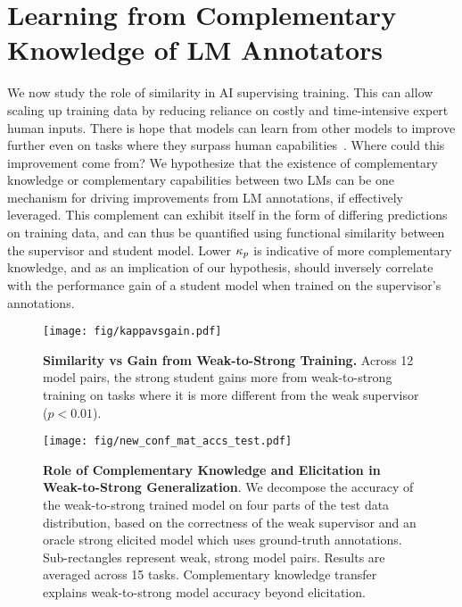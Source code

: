 \section{Learning from Complementary Knowledge of LM Annotators}
\label{sec:w2s}
We now study the role of similarity in AI supervising training. This can allow scaling up training data by reducing reliance on costly and time-intensive expert human inputs. There is hope that models can learn from other models to improve further even on tasks where they surpass human capabilities~\citep{hughes2024openendednessessentialartificialsuperhuman}. Where could this improvement come from? We hypothesize that the existence of complementary knowledge or complementary capabilities between two LMs can be one mechanism for driving improvements from LM annotations, if effectively leveraged. This complement can exhibit itself in the form of differing predictions on training data, and can thus be quantified using functional similarity between the supervisor and student model. Lower $\kappa_{p}$ is indicative of more complementary knowledge, and as an implication of our hypothesis, should inversely correlate with the performance gain of a student model when trained on the supervisor's annotations.


\begin{figure}[t]
    \centering
    \texttt{[image: fig/kappavsgain.pdf]}
    \caption{\textbf{Similarity vs Gain from Weak-to-Strong Training.} Across 12 model pairs, the strong student gains more from weak-to-strong training on tasks where it is more different from the weak supervisor ($p < 0.01$).}
    \label{fig:kappavsgain}
\end{figure}

\begin{figure}[t]
    \centering
    \texttt{[image: fig/new\_conf\_mat\_accs\_test.pdf]}
    \caption{\textbf{Role of Complementary Knowledge and Elicitation in Weak-to-Strong Generalization}. We decompose the accuracy of the weak-to-strong trained model on four parts of the test data distribution, based on the correctness of the weak supervisor and an oracle strong elicited model which uses ground-truth annotations. Sub-rectangles represent weak, strong model pairs. Results are averaged across 15 tasks. Complementary knowledge transfer explains weak-to-strong model accuracy beyond elicitation.}
    \label{fig:conftest}
    \vspace{-0.3cm}
\end{figure}

